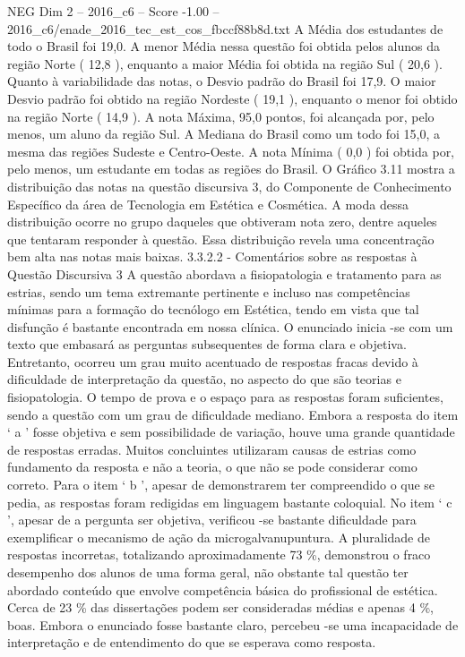 \begin{textsample}{NEG Dim 2 – 2016\_c6 – Score -1.00 – 2016\_c6/enade\_2016\_tec\_est\_cos\_fbccf88b8d.txt}
A Média dos estudantes de todo o Brasil foi 19,0.
A menor Média nessa questão foi obtida pelos alunos da região Norte ( 12,8 ), enquanto a maior Média foi obtida na região Sul ( 20,6 ).
Quanto à variabilidade das notas, o Desvio padrão do Brasil foi 17,9.
O maior Desvio padrão foi obtido na região Nordeste ( 19,1 ), enquanto o menor foi obtido na região Norte ( 14,9 ).
A nota Máxima, 95,0 pontos, foi alcançada por, pelo menos, um aluno da região Sul.
A Mediana do Brasil como um todo foi 15,0, a mesma das regiões Sudeste e Centro-Oeste.
A nota Mínima ( 0,0 ) foi obtida por, pelo menos, um estudante em todas as regiões do Brasil.
O Gráfico 3.11 mostra a distribuição das notas na questão discursiva 3, do Componente de Conhecimento Específico da área de Tecnologia em Estética e Cosmética.
A moda dessa distribuição ocorre no grupo daqueles que obtiveram nota zero, dentre aqueles que tentaram responder à questão.
Essa distribuição revela uma concentração bem alta nas notas mais baixas. 3.3.2.2 - Comentários sobre as respostas à Questão Discursiva 3 A questão abordava a fisiopatologia e tratamento para as estrias, sendo um tema extremante pertinente e incluso nas competências mínimas para a formação do tecnólogo em Estética, tendo em vista que tal disfunção é bastante encontrada em nossa clínica.
O enunciado inicia -se com um texto que embasará as perguntas subsequentes de forma clara e objetiva.
Entretanto, ocorreu um grau muito acentuado de respostas fracas devido à dificuldade de interpretação da questão, no aspecto do que são teorias e fisiopatologia.
O tempo de prova e o espaço para as respostas foram suficientes, sendo a questão com um grau de dificuldade mediano.
Embora a resposta do item ‘ a ’ fosse objetiva e sem possibilidade de variação, houve uma grande quantidade de respostas erradas.
Muitos concluintes utilizaram causas de estrias como fundamento da resposta e não a teoria, o que não se pode considerar como correto.
Para o item ‘ b ’, apesar de demonstrarem ter compreendido o que se pedia, as respostas foram redigidas em linguagem bastante coloquial.
No item ‘ c ’, apesar de a pergunta ser objetiva, verificou -se bastante dificuldade para exemplificar o mecanismo de ação da microgalvanupuntura.
A pluralidade de respostas incorretas, totalizando aproximadamente 73 \%, demonstrou o fraco desempenho dos alunos de uma forma geral, não obstante tal questão ter abordado conteúdo que envolve competência básica do profissional de estética.
Cerca de 23 \% das dissertações podem ser consideradas médias e apenas 4 \%, boas.
Embora o enunciado fosse bastante claro, percebeu -se uma incapacidade de interpretação e de entendimento do que se esperava como resposta.

\end{textsample}
